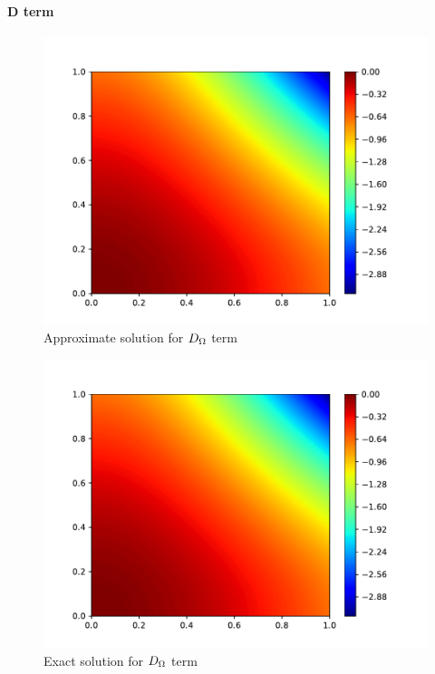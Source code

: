 \paragraph{D term}
\begin{figure}[H]
    \includegraphics[height=0.4\textheight]{media/enstrophy-transport-terms/D-term-approx.pdf}
    \caption{Approximate solution for $D_{\Omega}$ term}
    \label{fig:d-approx}
\end{figure}
\begin{figure}[H]
    \includegraphics[height=0.4\textheight]{media/enstrophy-transport-terms/D-term-exact.pdf}
    \caption{Exact solution for $D_{\Omega}$ term}
    \label{fig:d-exact}
\end{figure}
